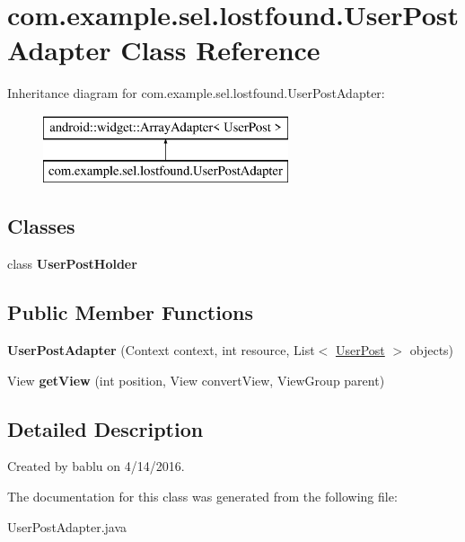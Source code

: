 \hypertarget{classcom_1_1example_1_1sel_1_1lostfound_1_1UserPostAdapter}{\section{com.\-example.\-sel.\-lostfound.\-User\-Post\-Adapter Class Reference}
\label{classcom_1_1example_1_1sel_1_1lostfound_1_1UserPostAdapter}
}
Inheritance diagram for com.\-example.\-sel.\-lostfound.\-User\-Post\-Adapter\-:\begin{figure}[H]
\begin{center}
\leavevmode
\includegraphics[height=2.000000cm]{classcom_1_1example_1_1sel_1_1lostfound_1_1UserPostAdapter}
\end{center}
\end{figure}
\subsection*{Classes}
\begin{DoxyCompactItemize}
\item 
class {\bfseries User\-Post\-Holder}
\end{DoxyCompactItemize}
\subsection*{Public Member Functions}
\begin{DoxyCompactItemize}
\item 
\hypertarget{classcom_1_1example_1_1sel_1_1lostfound_1_1UserPostAdapter_a8770784429d0552a7472193206396700}{{\bfseries User\-Post\-Adapter} (Context context, int resource, List$<$ \hyperlink{classcom_1_1example_1_1sel_1_1lostfound_1_1UserPost}{User\-Post} $>$ objects)}\label{classcom_1_1example_1_1sel_1_1lostfound_1_1UserPostAdapter_a8770784429d0552a7472193206396700}

\item 
\hypertarget{classcom_1_1example_1_1sel_1_1lostfound_1_1UserPostAdapter_ab3b3a8f8ee3bb0bf9a8a863209009395}{View {\bfseries get\-View} (int position, View convert\-View, View\-Group parent)}\label{classcom_1_1example_1_1sel_1_1lostfound_1_1UserPostAdapter_ab3b3a8f8ee3bb0bf9a8a863209009395}

\end{DoxyCompactItemize}


\subsection{Detailed Description}
Created by bablu on 4/14/2016. 

The documentation for this class was generated from the following file\-:\begin{DoxyCompactItemize}
\item 
User\-Post\-Adapter.\-java\end{DoxyCompactItemize}
